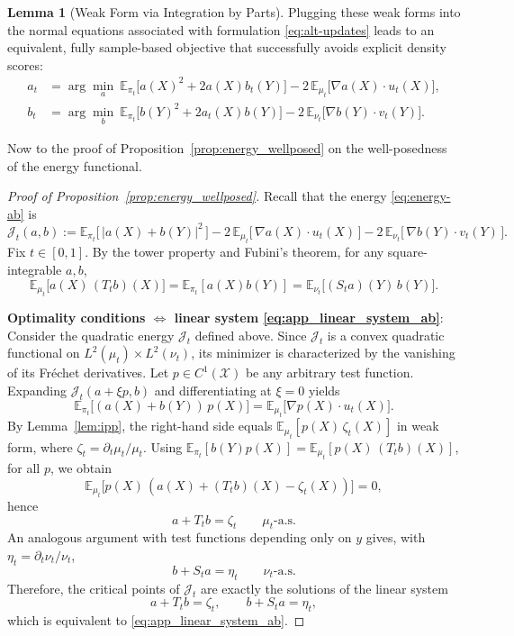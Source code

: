 \documentclass[11pt]{article}
\theoremstyle{definition}
\newtheorem{lemma}[theorem]{Lemma}
\numberwithin{equation}{section}%
\begin{document}
{\begin{lemma}[Weak Form via Integration by Parts]
Plugging these weak forms into the normal equations associated with formulation \eqref{eq:alt-updates} leads to an equivalent, fully sample-based objective that successfully avoids explicit density scores:
\begin{equation}
\label{eq:weak-alt-updates}
\begin{aligned}
a_t & =  \arg\min_{a}\ 
\mathbb{E}_{\pi_t}\!\Big[a(X)^2 +2a(X)b_t(Y)\Big]
-2\,\mathbb{E}_{\mu_t}\!\Big[\nabla a(X)\cdot u_t(X)\Big],\\
b_t & =  \arg\min_{b}\ 
\mathbb{E}_{\pi_t}\!\Big[b(Y)^2 +2a_t(X)b(Y)\Big]
-2\,\mathbb{E}_{\nu_t}\!\Big[\nabla b(Y)\cdot v_t(Y)\Big].
\end{aligned}
\end{equation}
\end{lemma}


Now to the proof of Proposition~\ref{prop:energy_wellposed} on the well-posedness of the energy functional.

\begin{proof}[Proof of Proposition~\ref{prop:energy_wellposed}]
Recall that the energy \eqref{eq:energy-ab} is
\[
\mathcal J_t(a,b)
:= \mathbb{E}_{\pi_t}\!\big[\,|a(X)+b(Y)|^2\,\big]
   -2\,\mathbb{E}_{\mu_t}\!\big[\,\nabla a(X)\!\cdot\! u_t(X)\,\big]
   -2\,\mathbb{E}_{\nu_t}\!\big[\,\nabla b(Y)\!\cdot\! v_t(Y)\,\big].
\]
Fix $t\in[0,1]$. By the tower property and Fubini's theorem, for any square-integrable $a,b$,
\begin{equation}
\label{eq:app_dual_T_S}
\mathbb E_{\mu_t}\!\big[a(X)\,(T_t b)(X)\big]
=
\mathbb E_{\pi_t}[a(X)b(Y)]
=
\mathbb E_{\nu_t}\!\big[(S_t a)(Y)\,b(Y)\big].
\end{equation}

\noindent\textbf{Optimality conditions $\Leftrightarrow$ linear system \eqref{eq:app_linear_system_ab}}:
Consider the quadratic energy $\mathcal J_t$ defined above. Since $\mathcal J_t$ is a convex quadratic functional on $L^2(\mu_t)\times L^2(\nu_t)$,  its minimizer is characterized by the vanishing of its
Fr\'echet derivatives. Let $p\in C^1(\mathcal X)$ be any arbitrary test function.
Expanding $\mathcal J_t(a+\xi p,b)$ and differentiating at $\xi=0$ yields
\[
\mathbb E_{\pi_t}\!\big[(a(X)+b(Y))\,p(X)\big]
=
\mathbb E_{\mu_t}\!\big[\nabla p(X)\cdot u_t(X)\big].
\]
By Lemma~\ref{lem:ipp}, the right-hand side equals $\mathbb E_{\mu_t}[p(X)\,\zeta_t(X)]$ in weak form,
where $\zeta_t=\partial_t\mu_t/\mu_t$. Using
$\mathbb E_{\pi_t}[b(Y)p(X)]=\mathbb E_{\mu_t}[p(X)\,(T_t b)(X)]$, for all $p$, 
we obtain
\[
\mathbb E_{\mu_t}\!\big[p(X)\,(a(X)+(T_t b)(X)-\zeta_t(X))\big]=0,
\]
hence
\[
a+T_t b=\zeta_t\qquad \mu_t\text{-a.s.}
\]
An analogous argument with test functions depending only on $y$ gives, with $\eta_t=\partial_t\nu_t/\nu_t$,
\[
b+S_t a=\eta_t\qquad \nu_t\text{-a.s.}
\]
Therefore, the critical points of $\mathcal J_t$ are exactly the solutions of the linear system
\[
a+T_t b=\zeta_t,\qquad b+S_t a=\eta_t,
\]
which is equivalent to \eqref{eq:app_linear_system_ab}.


\end{proof}}
\end{document}
